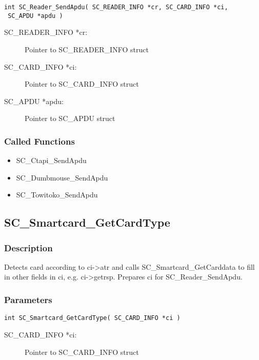 \documentclass[a4paper,oneside]{article}
\begin{document}
\begin{verbatim}
int SC_Reader_SendApdu( SC_READER_INFO *cr, SC_CARD_INFO *ci,
 SC_APDU *apdu )
\end{verbatim}

\begin{description}
\item[SC\_READER\_INFO *cr:] Pointer to SC\_READER\_INFO struct
\item[SC\_CARD\_INFO *ci:] Pointer to SC\_CARD\_INFO struct
\item[SC\_APDU *apdu:] Pointer to SC\_APDU struct
\end{description}

\subsubsection*{Called Functions}

\begin{itemize}
\item SC\_Ctapi\_SendApdu
\item SC\_Dumbmouse\_SendApdu
\item SC\_Towitoko\_SendApdu
\end{itemize}


\subsection{SC\_Smartcard\_GetCardType}

\subsubsection*{Description}

Detects card according to ci->atr and calls SC\_Smartcard\_GetCarddata
to fill in other fields in ci, e.g. ci->getrsp. Prepares ci for
SC\_Reader\_SendApdu.

\subsubsection*{Parameters}

\begin{verbatim}
int SC_Smartcard_GetCardType( SC_CARD_INFO *ci )
\end{verbatim}

\begin{description}
\item[SC\_CARD\_INFO *ci:] Pointer to SC\_CARD\_INFO struct
\end{description}
\end{document}
